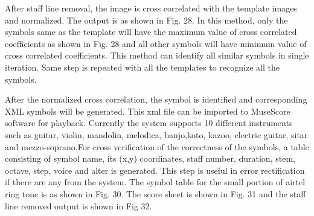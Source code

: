 \documentclass[journal]{IEEEtran}
\begin{document}
After staff line removal, the image is cross correlated with the template images and normalized. The output is as shown in Fig. 28. In this method, only the symbols same as the template will have the maximum value of cross correlated coefficients as shown in Fig. 28 and all other symbols will have minimum value of cross correlated coefficients. This method can identify all similar symbols in single iteration. Same step is repeated with all the templates to recognize all the symbols. \par
After the normalized cross correlation, the symbol is identified and corresponding XML symbols will be generated. This xml file can be imported to MuseScore software for playback. Currently the system supports 10 different instruments such as guitar, violin, mandolin, melodica, banjo,koto, kazoo, electric guitar, sitar and mezzo-soprano.For cross verification of the correctness of the symbols, a table consisting of symbol name, its (x,y) coordinates, staff number, duration, stem, octave, step, voice and alter is generated. This step is useful in error rectification if there are any from the system. The symbol table for the small portion of airtel ring tone is as shown in Fig. 30. The score sheet is shown in Fig. 31 and the staff line removed output is shown in Fig 32.




%
\end{document}
